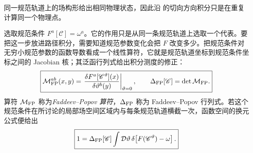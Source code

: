 同一规范轨道上的场构形给出相同物理状态，因此沿 的切向方向积分只是在重复计算同一个物理点。

选取规范条件 $F^a[\mathscr C]=\omega^a$。它的作用只是从同一条规范轨道上选取一个代表。要把这一步放进路径积分，需要知道规范参数变化会把 $F$ 改变多少。把规范条件对无穷小规范参数的函数导数看成一个线性算符，它就是规范轨道坐标到规范条件坐标之间的 Jacobian 核；其泛函行列式给出积分测度的修正：
\begin{equation}
\boxed{
 \mathcal M_{\rm FP}^{ab}(x,y)
 =\left.\frac{\delta F^a[\mathscr C^\vartheta](x)}{\delta\vartheta^b(y)}\right|_{\vartheta=0},
 \qquad
 \Delta_{\rm FP}[\mathscr C]=\det\mathcal M_{\rm FP}.}
\label{eq:fp-jacobian-definition-dp68}
\end{equation}
算符 $\mathcal M_{\rm FP}$ 称为\emph{Faddeev--Popov 算符}，$\Delta_{\rm FP}$ 称为 Faddeev--Popov 行列式。若这个规范条件在所讨论的局部场空间区域内与每条规范轨道横截一次，函数空间的换元公式便给出
\begin{equation}
 \boxed{
 1=\Delta_{\rm FP}[\mathscr C]
 \int\mathcal D\vartheta\,
 \delta\!\left[F(\mathscr C^\vartheta)-\omega\right].}
 \label{eq:fp-identity-general-dp11}
\end{equation}


